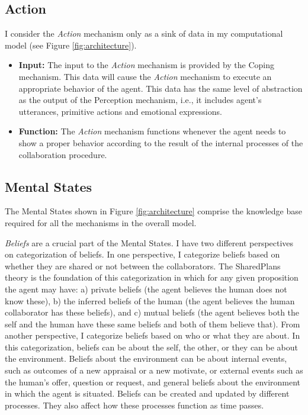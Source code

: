 \documentclass[12pt]{report}
\begin{document}
\subsection{Action}

I consider the \textit{Action} mechanism only as a sink of data in my
computational model (see Figure \ref{fig:architecture}).

\begin{itemize}
  \item \textbf{Input:} The input to the \textit{Action} mechanism is provided by
  the Coping mechanism. This data will cause the \textit{Action} mechanism to
  execute an appropriate behavior of the agent. This data has the same level of
  abstraction as the output of the Perception mechanism, i.e., it includes agent's
  utterances, primitive actions and emotional expressions.
  
  \item \textbf{Function:} The \textit{Action} mechanism functions whenever the
  agent needs to show a proper behavior according to the result of the internal
  processes of the collaboration procedure.
\end{itemize}

\subsection{Mental States}
\label{sec:mental-states}
The Mental States shown in Figure \ref{fig:architecture} comprise the knowledge
base required for all the mechanisms in the overall model.

\textit{Beliefs} are a crucial part of the Mental States. I have two different
perspectives on categorization of beliefs. In one perspective, I categorize
beliefs based on whether they are shared or not between the collaborators. The
SharedPlans \cite{grosz:plans-discourse} theory is the foundation of this
categorization in which for any given proposition the agent may have: a) private
beliefs (the agent believes the human does not know these), b) the inferred
beliefs of the human (the agent believes the human collaborator has these
beliefs), and c) mutual beliefs (the agent believes both the self and the human
have these same beliefs and both of them believe that). From another
perspective, I categorize beliefs based on who or what they are about. In this
categorization, beliefs can be about the self, the other, or they can be about
the environment. Beliefs about the environment can be about internal events,
such as outcomes of a new appraisal or a new motivate, or external events such
as the human's offer, question or request, and general beliefs about the
environment in which the agent is situated. Beliefs can be created and updated
by different processes. They also affect how these processes function as time
passes.
\end{document}
